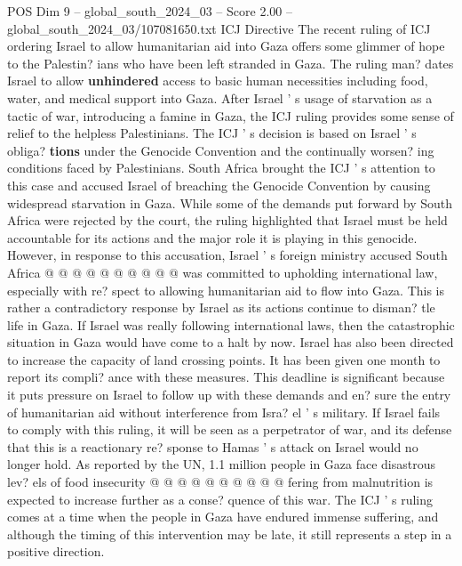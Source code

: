 \begin{textsample}{POS Dim 9 – global\_south\_2024\_03 – Score 2.00 – global\_south\_2024\_03/107081650.txt}  \label{ex:f9_pos_049}
ICJ Directive The recent ruling of ICJ ordering Israel to allow humanitarian aid into Gaza offers some glimmer of hope to the Palestin? ians who have been left stranded in Gaza.
The ruling man? dates Israel to allow \textbf{unhindered} access to basic human necessities including food, water, and medical support into Gaza.
After Israel ' s usage of starvation as a tactic of war, introducing a famine in Gaza, the ICJ ruling provides some sense of relief to the helpless Palestinians.
The ICJ ' s decision is based on Israel ' s obliga? \textbf{tions} under the Genocide Convention and the continually worsen? ing conditions faced by Palestinians.
South Africa brought the ICJ ' s attention to this case and accused Israel of breaching the Genocide Convention by causing widespread starvation in Gaza.
While some of the demands put forward by South Africa were rejected by the court, the ruling highlighted that Israel must be held accountable for its actions and the major role it is playing in this genocide.
However, in response to this accusation, Israel ' s foreign ministry accused South Africa @ @ @ @ @ @ @ @ @ @ was committed to upholding international law, especially with re? spect to allowing humanitarian aid to flow into Gaza.
This is rather a contradictory response by Israel as its actions continue to disman? tle life in Gaza.
If Israel was really following international laws, then the catastrophic situation in Gaza would have come to a halt by now.
Israel has also been directed to increase the capacity of land crossing points.
It has been given one month to report its compli? ance with these measures.
This deadline is significant because it puts pressure on Israel to follow up with these demands and en? sure the entry of humanitarian aid without interference from Isra? el ' s military.
If Israel fails to comply with this ruling, it will be seen as a perpetrator of war, and its defense that this is a reactionary re? sponse to Hamas ' s attack on Israel would no longer hold.
As reported by the UN, 1.1 million people in Gaza face disastrous lev? els of food insecurity @ @ @ @ @ @ @ @ @ @ fering from malnutrition is expected to increase further as a conse? quence of this war.
The ICJ ' s ruling comes at a time when the people in Gaza have endured immense suffering, and although the timing of this intervention may be late, it still represents a step in a positive direction.

\end{textsample}
